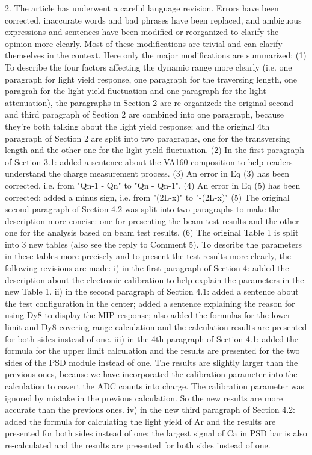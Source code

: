 \documentclass[]{article}
\begin{document}
2. The article has underwent a careful language revision. Errors have been corrected, inaccurate words and bad phrases have been replaced, and ambiguous expressions and sentences have been modified or reorganized to clarify the opinion more clearly. 
Most of these modifications are trivial and can clarify themselves in the context. Here only the major modifications are summarized:
     (1) To describe the four factors affecting the dynamic range more clearly (i.e. one paragraph for light yield response, one paragraph for the traversing length, one paragrah for the light yield fluctuation and one paragraph for the light attenuation), the paragraphs in Section 2 are re-organized: the original second and third paragraph of Section 2 are combined into one paragraph, because they're both talking about the light yield response; and the original 4th paragraph of Section 2 are split into two paragraphs, one for the transversing length and the other one for the light yield fluctuation.  
     (2) In the first paragraph of Section 3.1: added a sentence about the VA160 composition to help readers understand the charge measurement process.
     (3) An error in Eq (3) has been corrected, i.e. from "Qn-1 - Qn" to "Qn - Qn-1".
     (4) An error in Eq (5) has been corrected: added a minus sign, i.e. from "(2L-x)" to "-(2L-x)"
     (5) The original second paragraph of Section 4.2 was split into two paragraphs to make the description more concise: one for presenting the beam test results and the other one for the analysis based on beam test results.  
     (6) The original Table 1 is split into 3 new tables (also see the reply to Comment 5). To describe the parameters in these tables more precisely and to present the test results more clearly, the following revisions are made:
	     i) in the first paragraph of Section 4: added the description about the electronic calibration to help explain the parameters in the new Table 1.
	     ii) in the second paragraph of Section 4.1: added a sentence about the test configuration in the center; added a sentence explaining the reason for using Dy8 to display the MIP response; also added the formulas for the lower limit and Dy8 covering range calculation and the calculation results are presented for both sides instead of one.
	     iii) in the 4th paragraph of Section 4.1: added the formula for the upper limit calculation and the results are presented for the two sides of the PSD module instead of one. The results are slightly larger than the previous ones, because we have incorporated the calibration parameter into the calculation to covert the ADC counts into charge. The calibration parameter was ignored by mistake in the previous calculation. So the new results are more accurate than the previous ones.
	     iv) in the new third paragraph of Section 4.2: added the formula for calculating the light yield of Ar and the results are presented for both sides instead of one; the largest signal of Ca in PSD bar is also re-calculated and the results are presented for both sides instead of one.
      
\end{document}
